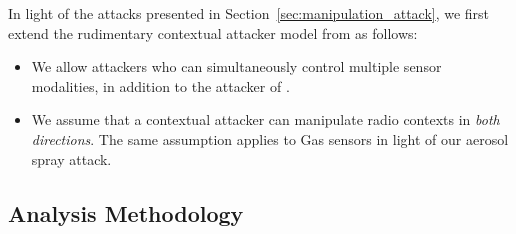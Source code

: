 


In light of the attacks presented in
Section~\ref{sec:manipulation_attack}, we first extend the rudimentary
contextual attacker model from \cite{TruongPerCom14} as follows:


\begin{itemize} \itemsep0em 


\item We allow \multimodal attackers who can simultaneously control
multiple sensor modalities, in addition to the \singlemodal attacker of
\cite{TruongPerCom14}. 


\item 
We assume that a contextual attacker can
manipulate radio contexts in \emph{both directions}. The same 
assumption applies to Gas sensors in light of our aerosol spray attack.
\end{itemize}



\subsection{Analysis Methodology} \label{sec:analysis_method}



